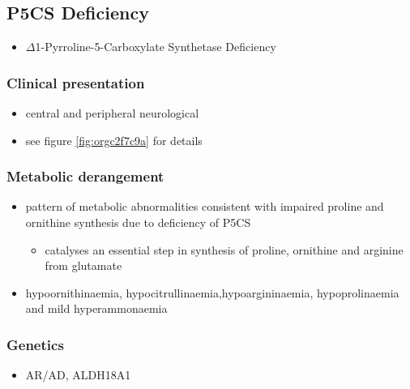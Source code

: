 \documentclass{scrartcl}
\begin{document}
\subsection{P5CS  Deficiency}
\label{sec:org1b50247}
\begin{itemize}
\item \(\Delta\)1-Pyrroline-5-Carboxylate Synthetase Deficiency
\end{itemize}

\subsubsection{Clinical presentation}
\label{sec:org925159c}
\begin{itemize}
\item central and peripheral neurological
\item see figure \ref{fig:orgc2f7c9a} for details
\end{itemize}

\subsubsection{Metabolic derangement}
\label{sec:org374660c}
\begin{itemize}
\item pattern of metabolic abnormalities consistent with impaired proline
and ornithine synthesis due to deficiency of P5CS
\begin{itemize}
\item catalyses an essential step in synthesis of proline, ornithine and
arginine from glutamate
\end{itemize}
\item hypoornithinaemia, hypocitrullinaemia,hypoargininaemia,
hypoprolinaemia and mild hyperammonaemia
\end{itemize}

\subsubsection{Genetics}
\label{sec:orge9bd463}
\begin{itemize}
\item AR/AD, ALDH18A1
\end{itemize}
\end{document}
